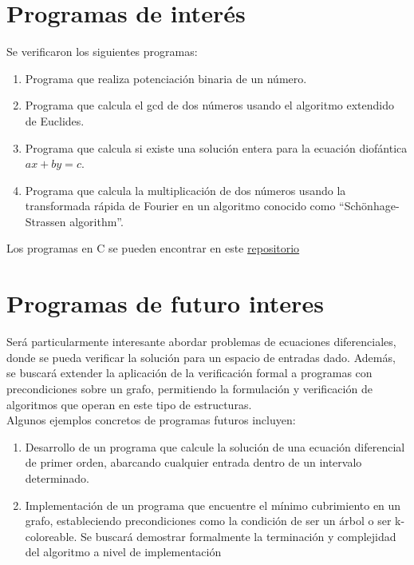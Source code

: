 \documentclass{hw-template}
\begin{document}
\section{Programas de interés}
Se verificaron los siguientes programas:
\begin{enumerate}
    \item Programa que realiza potenciación binaria de un número.
    \item Programa que calcula el gcd de dos números usando el algoritmo
    extendido de Euclides.
    \item Programa que calcula si existe una solución entera para la ecuación
    diofántica $ax + by = c$.
    \item Programa que calcula la multiplicación de dos números usando la transformada
    rápida de Fourier en un algoritmo conocido como ``Schönhage-Strassen algorithm''.
\end{enumerate}

Los programas en C se pueden encontrar en este \href{https://github.com/KurtCoVayne/cm0081-2023-2-lab3/tree/main/src}{repositorio} 

\section{Programas de futuro interes}
Será particularmente interesante abordar problemas de ecuaciones diferenciales,
donde se pueda verificar la solución para un espacio de entradas dado. Además,
se buscará extender la aplicación de la verificación formal a programas con
precondiciones sobre un grafo, permitiendo la formulación y verificación de
algoritmos que operan en este tipo de estructuras. \\

Algunos ejemplos concretos de programas futuros incluyen:

\begin{enumerate}
    \item Desarrollo de un programa que calcule la solución de una ecuación
    diferencial de primer orden, abarcando cualquier entrada dentro de un
    intervalo determinado.
    \item Implementación de un programa que encuentre el mínimo cubrimiento
    en un grafo, estableciendo precondiciones como la condición de ser un
    árbol o ser k-coloreable. Se buscará demostrar formalmente la terminación 
    y complejidad del algoritmo a nivel de implementación
\end{enumerate}
\end{document}
